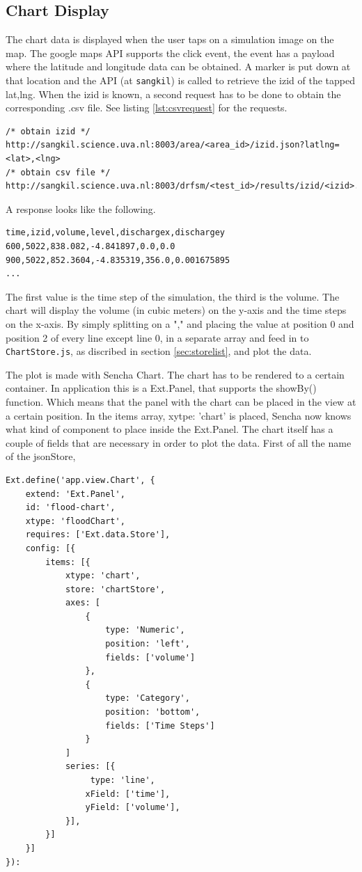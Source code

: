 \subsection{Chart Display}
The chart data is displayed when the user taps on a simulation image on the map. The google maps API supports the click event, the event has a payload where the latitude and longitude data can be obtained. A marker is put down at that location and the API (at \texttt{sangkil}) is called to retrieve the izid of the tapped lat,lng. When the izid is known, a second request has to be done to obtain the corresponding .csv file. See listing \ref{lst:csvrequest} for the requests.

\begin{lstlisting}[caption={requests for flood data}, label={lst:csvrequests}]
/* obtain izid */
http://sangkil.science.uva.nl:8003/area/<area_id>/izid.json?latlng=
<lat>,<lng> 
/* obtain csv file */
http://sangkil.science.uva.nl:8003/drfsm/<test_id>/results/izid/<izid>.csv 
\end{lstlisting}
 
A response looks like the following.
\begin{lstlisting}[caption={csv response}, label={lst:csvresponse}]
time,izid,volume,level,dischargex,dischargey
600,5022,838.082,-4.841897,0.0,0.0
900,5022,852.3604,-4.835319,356.0,0.001675895
...
\end{lstlisting}
The first value is the time step of the simulation, the third is the volume. The chart will display the volume (in cubic meters) on the y-axis and the time steps on the x-axis. By simply splitting on a "," and placing the value at position 0 and position 2 of every line except line 0, in a separate array and feed in to \texttt{ChartStore.js}, as discribed in section \ref{sec:storelist}, and plot the data.

The plot is made with Sencha Chart. The chart has to be rendered to a certain container. In application this is a Ext.Panel, that supports the showBy() function. Which means that the panel with the chart can be placed in the view at a certain position. In the items array, xytpe: 'chart' is placed, Sencha now knows what kind of component to place inside the Ext.Panel. The chart itself has a couple of fields that are necessary in order to plot the data. First of all the name of the jsonStore,


\begin{lstlisting}[caption=Chart component app/view/Chart.js, label="chartcomponent" ]
Ext.define('app.view.Chart', {
	extend: 'Ext.Panel',
    id: 'flood-chart',
	xtype: 'floodChart',
    requires: ['Ext.data.Store'],
    config: [{
    	items: [{
			xtype: 'chart',
			store: 'chartStore',
			axes: [
				{
					type: 'Numeric',
					position: 'left',
					fields: ['volume']
				},
				{
					type: 'Category',
					position: 'bottom',
					fields: ['Time Steps']
				}			
			]
			series: [{
				 type: 'line',
                xField: ['time'],
                yField: ['volume'],
            }],
    	}]
    }]
}):
\end{lstlisting}


